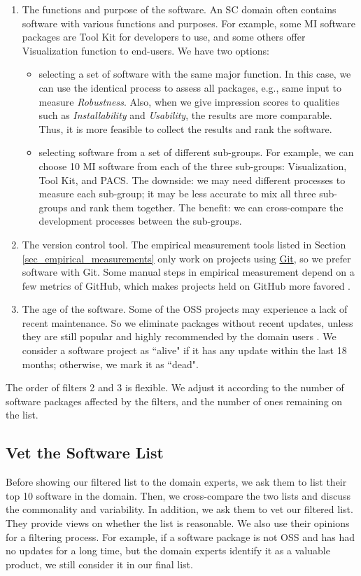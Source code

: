\begin{enumerate}
\item The functions and purpose of the software. An SC domain often contains software with various functions and purposes. For example, some MI software packages are Tool Kit for developers to use, and some others offer Visualization function to end-users. We have two options:
\begin{itemize}
\item selecting a set of software with the same major function. In this case, we can use the identical process to assess all packages, e.g., same input to measure \textit{Robustness}. Also, when we give impression scores to qualities such as \textit{Installability} and \textit{Usability}, the results are more comparable. Thus, it is more feasible to collect the results and rank the software.
\item selecting software from a set of different sub-groups. For example, we can choose 10 MI software from each of the three sub-groups: Visualization, Tool Kit, and PACS. The downside: we may need different processes to measure each sub-group; it may be less accurate to mix all three sub-groups and rank them together. The benefit: we can cross-compare the development processes between the sub-groups.
\end{itemize}

\item The version control tool. The empirical measurement tools listed in Section \ref{sec_empirical_measurements} only work on projects using \hyperlink{https://git-scm.com/}{Git}, so we prefer software with Git. Some manual steps in empirical measurement depend on a few metrics of GitHub, which makes projects held on GitHub more favored \cite{SmithEtAl2021}.

\item The age of the software. Some of the OSS projects may experience a lack of recent maintenance. So we eliminate packages without recent updates, unless they are still popular and highly recommended by the domain users \cite{SmithEtAl2021}. We consider a software project as ``alive" if it has any update within the last 18 months; otherwise, we mark it as ``dead".
\end{enumerate}

The order of filters 2 and 3 is flexible. We adjust it according to the number of software packages affected by the filters, and the number of ones remaining on the list.

\subsection{Vet the Software List}
\label{sec_vet_software_list}
Before showing our filtered list to the domain experts, we ask them to list their top 10 software in the domain. Then, we cross-compare the two lists and discuss the commonality and variability.  In addition, we ask them to vet our filtered list. They provide views on whether the list is reasonable. We also use their opinions for a filtering process. For example, if a software package is not OSS and has had no updates for a long time, but the domain experts identify it as a valuable product, we still consider it in our final list.

